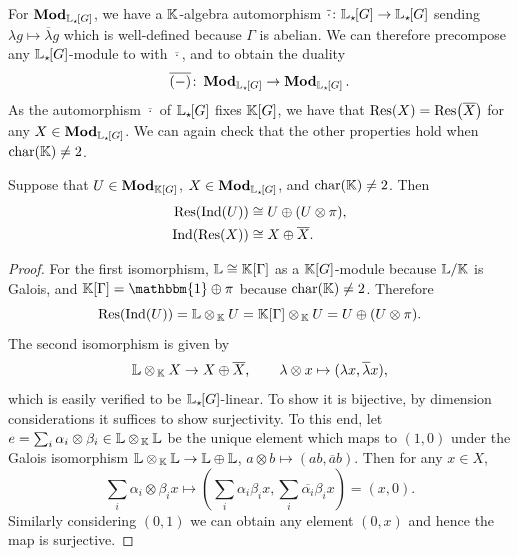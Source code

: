 For $\operatorname{\mathbf{Mod}}_{{\mathbb L}_{\star \hspace{-0.1em}}[G]}$, we have a ${\mathbb K}$-algebra automorphism $\overline{\cdot} \colon {\mathbb L}_{\star \hspace{-0.1em}}[G] \rightarrow {\mathbb L}_{\star \hspace{-0.1em}}[G]$ sending $\lambda g \mapsto \overline{\lambda} g$ which is well-defined because $\Gamma$ is abelian. We can therefore precompose any ${\mathbb L}_{\star \hspace{-0.1em}}[G]$-module to with $\overline{\cdot}$, and to obtain the duality
\[
\overline{(-)} \colon \operatorname{\mathbf{Mod}}_{{\mathbb L}_{\star \hspace{-0.1em}}[G]} \rightarrow \operatorname{\mathbf{Mod}}_{{\mathbb L}_{\star \hspace{-0.1em}}[G]}.
\]
As the automorphism $\overline{\cdot}$ of ${\mathbb L}_{\star \hspace{-0.1em}}[G]$ fixes ${\mathbb K}[G]$, we have that $\Res(X) = \Res(\overline{X})$ for any $X \in \operatorname{\mathbf{Mod}}_{{\mathbb L}_{\star \hspace{-0.1em}}[G]}$. We can again check that the other properties hold when $\operatorname{char}({\mathbb K}) \neq 2$.

\begin{prop}\label{prop:resindKGLG}
Suppose that $U \in \operatorname{\mathbf{Mod}}_{{\mathbb K}[G]}$, $X \in \operatorname{\mathbf{Mod}}_{{\mathbb L}_{\star \hspace{-0.1em}}[G]}$, and $\operatorname{char}({\mathbb K}) \neq 2$. Then 
\begin{align*}
    \Res(\Ind(U)) &\cong U \oplus (U \otimes \pi), \\
    \Ind(\Res(X)) &\cong X \oplus \overline{X}.
\end{align*}
\end{prop}

\begin{proof}
    For the first isomorphism, ${\mathbb L} \cong {\mathbb K}[\Gamma]$ as a ${\mathbb K}[G]$-module because ${\mathbb L}/{\mathbb K}$ is Galois, and $\bK[\Gamma] = \mathbbm{1} \oplus \pi$ because $\operatorname{char}({\mathbb K}) \neq 2$. Therefore
    \[
        \Res(\Ind(U)) = \bL \otimes_{\bbK} U = \bK[\Gamma] \otimes_{\bbK} U = U \oplus (U \otimes \pi).
    \]
    The second isomorphism is given by
    \[
        {\mathbb L} \otimes_{\, {\mathbb K}} X \rightarrow X \oplus \overline{X}, \qquad \lambda \otimes x \mapsto (\lambda x, \overline{\lambda} x),
    \]
    which is easily verified to be ${\mathbb L}_{\star \hspace{-0.1em}}[G]$-linear. To show it is bijective, by dimension considerations it suffices to show surjectivity. To this end, let $e = \sum_i \alpha_i \otimes \beta_i \in {\mathbb L} \otimes_{\, {\mathbb K}} {\mathbb L}$ be the unique element which maps to $(1,0)$ under the Galois isomorphism ${\mathbb L} \otimes_{\, {\mathbb K}} {\mathbb L} \rightarrow {\mathbb L} \oplus {\mathbb L}$, $a \otimes b \mapsto (ab,\overline{a} b)$. Then for any $x \in X$, 
    \[
        \sum_i \alpha_i \otimes \beta_i x \mapsto \left(\sum_i \alpha_i \beta_i x, \sum_i \overline{\alpha_i} \beta_i x \right) = (x,0).
    \]
    Similarly considering $(0,1)$ we can obtain any element $(0,x)$ and hence the map is surjective.
\end{proof}

